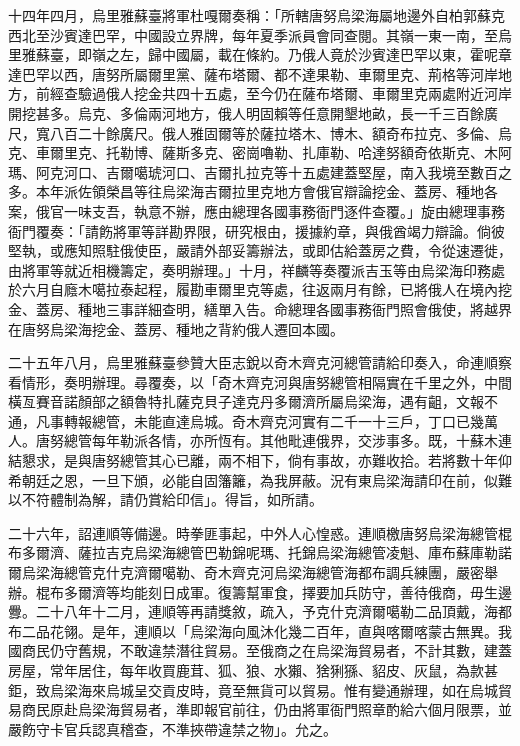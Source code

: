 \begin{pinyinscope}
十四年四月，烏里雅蘇臺將軍杜嘎爾奏稱：「所轄唐努烏梁海屬地邊外自柏郭蘇克西北至沙賓達巴罕，中國設立界牌，每年夏季派員會同查閱。其嶺一東一南，至烏里雅蘇臺，即嶺之左，歸中國屬，載在條約。乃俄人竟於沙賓達巴罕以東，霍呢章達巴罕以西，唐努所屬爾里黨、薩布塔爾、都不達果勒、車爾里克、荊格等河岸地方，前經查驗過俄人挖金共四十五處，至今仍在薩布塔爾、車爾里克兩處附近河岸開挖甚多。烏克、多倫兩河地方，俄人明固賴等任意開墾地畝，長一千三百餘廣尺，寬八百二十餘廣尺。俄人雅固爾等於薩拉塔木、博木、額奇布拉克、多倫、烏克、車爾里克、托勒博、薩斯多克、密崗嚕勒、扎庫勒、哈達努額奇依斯克、木阿瑪、阿克河口、吉爾噶琥河口、吉爾扎拉克等十五處建蓋堅屋，南入我境至數百之多。本年派佐領榮昌等往烏梁海吉爾拉里克地方會俄官辯論挖金、蓋房、種地各案，俄官一味支吾，執意不辦，應由總理各國事務衙門逐件查覆。」旋由總理事務衙門覆奏：「請飭將軍等詳勘界限，研究根由，援據約章，與俄酋竭力辯論。倘彼堅執，或應知照駐俄使臣，嚴請外部妥籌辦法，或即估給蓋房之費，令從速遷徙，由將軍等就近相機籌定，奏明辦理。」十月，祥麟等奏覆派吉玉等由烏梁海印務處於六月自廕木噶拉泰起程，履勘車爾里克等處，往返兩月有餘，已將俄人在境內挖金、蓋房、種地三事詳細查明，繕單入告。命總理各國事務衙門照會俄使，將越界在唐努烏梁海挖金、蓋房、種地之背約俄人遷回本國。

二十五年八月，烏里雅蘇臺參贊大臣志銳以奇木齊克河總管請給印奏入，命連順察看情形，奏明辦理。尋覆奏，以「奇木齊克河與唐努總管相隔實在千里之外，中間橫亙賽音諾顏部之額魯特扎薩克貝子達克丹多爾濟所屬烏梁海，遇有齟，文報不通，凡事轉報總管，未能直達烏城。奇木齊克河實有二千一十三戶，丁口已幾萬人。唐努總管每年勒派各情，亦所恆有。其他毗連俄界，交涉事多。既，十蘇木連結懇求，是與唐努總管其心已離，兩不相下，倘有事故，亦難收拾。若將數十年仰希朝廷之恩，一旦下頒，必能自固籓籬，為我屏蔽。況有東烏梁海請印在前，似難以不符體制為解，請仍賞給印信」。得旨，如所請。

二十六年，詔連順等備邊。時拳匪事起，中外人心惶惑。連順檄唐努烏梁海總管棍布多爾濟、薩拉吉克烏梁海總管巴勒錦呢瑪、托錦烏梁海總管凌魁、庫布蘇庫勒諾爾烏梁海總管克什克濟爾噶勒、奇木齊克河烏梁海總管海都布調兵練團，嚴密舉辦。棍布多爾濟等均能刻日成軍。復籌幫軍食，擇要加兵防守，善待俄商，毋生邊釁。二十八年十二月，連順等再請獎敘，疏入，予克什克濟爾噶勒二品頂戴，海都布二品花翎。是年，連順以「烏梁海向風沐化幾二百年，直與喀爾喀蒙古無異。我國商民仍守舊規，不敢違禁潛往貿易。至俄商之在烏梁海貿易者，不計其數，建蓋房屋，常年居住，每年收買鹿茸、狐、狼、水獺、猞猁猻、貂皮、灰鼠，為款甚鉅，致烏梁海來烏城呈交貢皮時，竟至無貨可以貿易。惟有變通辦理，如在烏城貿易商民原赴烏梁海貿易者，準即報官前往，仍由將軍衙門照章酌給六個月限票，並嚴飭守卡官兵認真稽查，不準挾帶違禁之物」。允之。


\end{pinyinscope}
